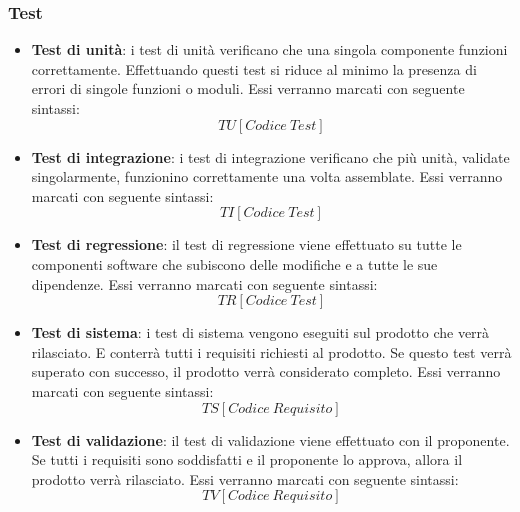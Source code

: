 \documentclass[../NormeDiProgetto.tex]{subfiles}
\begin{document}
\subsubsection{Test}
\begin{itemize}
	\item \textbf{Test di unità}:
		i test di unità verificano che una singola componente funzioni correttamente. Effettuando questi test si riduce al minimo la presenza di errori di singole funzioni o moduli. Essi verranno marcati con seguente sintassi:\\
		\begin{equation*}
  			TU[Codice \ Test]
		\end{equation*}
	\item \textbf{Test di integrazione}:
		i test di integrazione verificano che più unità, validate singolarmente, funzionino correttamente una volta assemblate. Essi verranno marcati con seguente sintassi:\\
\begin{equation*}
  TI[Codice \ Test]
\end{equation*}
\item \textbf{Test di regressione}:
il test di regressione viene effettuato su tutte le componenti software che subiscono delle modifiche e a tutte le sue dipendenze.
Essi verranno marcati con seguente sintassi:\\
\begin{equation*}
  TR[Codice \ Test]
\end{equation*}
\item \textbf{Test di sistema}:
i test di sistema vengono eseguiti sul prodotto che verrà rilasciato. E conterrà tutti i requisiti richiesti al prodotto. Se questo test verrà superato con successo, il prodotto verrà considerato completo.
Essi verranno marcati con seguente sintassi:\\
\begin{equation*}
  TS[Codice \ Requisito]
\end{equation*}
\item \textbf{Test di validazione}:
il test di validazione viene effettuato con il proponente. Se tutti i requisiti sono soddisfatti e il proponente lo approva, allora il prodotto verrà rilasciato.
Essi verranno marcati con seguente sintassi:\\
\begin{equation*}
  TV[Codice \ Requisito]
\end{equation*}
\end{itemize}
\end{document}
